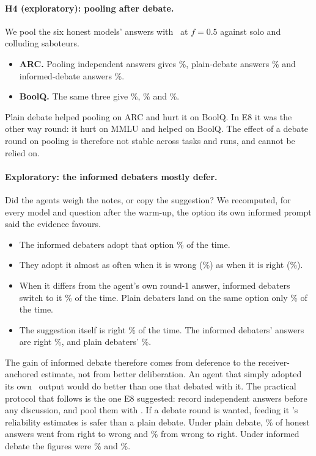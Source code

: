 \paragraph{H4 (exploratory): pooling after debate.} We pool the six honest models' answers with \race\ at $f=0.5$ against solo and colluding saboteurs.
\begin{itemize}[leftmargin=*,itemsep=1pt]
\item \textbf{ARC.} Pooling independent answers gives \liveTwoIndArcRace\%, plain-debate answers \liveTwoDebArcRace\% and informed-debate answers \liveTwoInfArcRace\%.
\item \textbf{BoolQ.} The same three give \liveTwoIndBoolqRace\%, \liveTwoDebBoolqRace\% and \liveTwoInfBoolqRace\%.
\end{itemize}
Plain debate helped pooling on ARC and hurt it on BoolQ. In E8 it was the other way round: it hurt on MMLU and helped on BoolQ. The effect of a debate round on pooling is therefore not stable across tasks and runs, and cannot be relied on.

\paragraph{Exploratory: the informed debaters mostly defer.} Did the agents weigh the notes, or copy the suggestion? We recomputed, for every model and question after the warm-up, the option its own informed prompt said the evidence favours.
\begin{itemize}[leftmargin=*,itemsep=1pt]
\item The informed debaters adopt that option \% of the time.
\item They adopt it almost as often when it is wrong (\%) as when it is right (\%).
\item When it differs from the agent's own round-1 answer, informed debaters switch to it \% of the time. Plain debaters land on the same option only \% of the time.
\item The suggestion itself is right \% of the time. The informed debaters' answers are right \%, and plain debaters' \%.
\end{itemize}
The gain of informed debate therefore comes from deference to the receiver-anchored estimate, not from better deliberation. An agent that simply adopted its own \race\ output would do better than one that debated with it. The practical protocol that follows is the one E8 suggested: record independent answers before any discussion, and pool them with \race. If a debate round is wanted, feeding it \race's reliability estimates is safer than a plain debate. Under plain debate, \liveTwoRightToWrongDebate\% of honest answers went from right to wrong and \liveTwoWrongToRightDebate\% from wrong to right. Under informed debate the figures were \liveTwoRightToWrongInformed\% and \liveTwoWrongToRightInformed\%.

